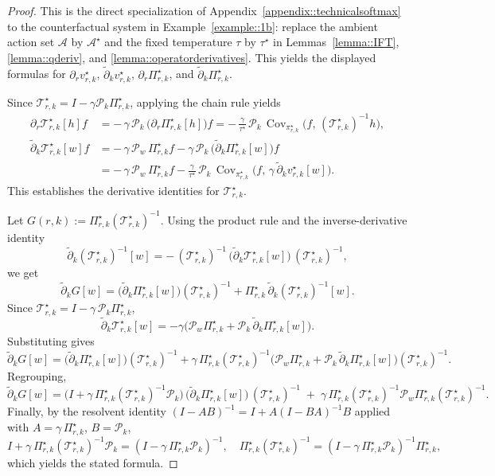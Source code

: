 \documentclass[11pt]{article}
\newcommand{\adk}{\widetilde{\partial}_k}
\theoremstyle{plain}
\begin{document}
\begin{proof}
This is the direct specialization of Appendix~\ref{appendix::technicalsoftmax} to the counterfactual system in Example~\ref{example::1b}: replace the ambient action set $\mathcal{A}$ by $\mathcal{A}^\star$ and the fixed temperature $\tau$ by $\tau^\star$ in Lemmas~\ref{lemma::IFT}, \ref{lemma::qderiv}, and \ref{lemma::operatorderivatives}. This yields the displayed formulas for $\partial_r v_{r,k}^\star$, $\adk v_{r,k}^\star$, $\partial_r \Pi_{r,k}^\star$, and $\adk \Pi_{r,k}^\star$.

Since $\mathcal{T}_{r,k}^\star = I - \gamma \mathcal{P}_k \Pi_{r,k}^\star$, applying the chain rule yields
\[
\begin{aligned}
\partial_r \mathcal{T}_{r,k}^\star[h] f
&= -\,\gamma\,\mathcal{P}_k\,\big(\partial_r \Pi_{r,k}^\star[h]\big)f
= -\,\tfrac{\gamma}{\tau^\star}\,\mathcal{P}_k\,\operatorname{Cov}_{\pi_{r,k}^\star}\!\big(f,\,(\mathcal{T}_{r,k}^\star)^{-1}h\big), \\[6pt]
\adk \mathcal{T}_{r,k}^\star[w] f
&= -\,\gamma\,\mathcal{P}_w\,\Pi_{r,k}^\star f
- \gamma\,\mathcal{P}_k\,\big(\adk \Pi_{r,k}^\star[w]\big)f \\[3pt]
&= -\,\gamma\,\mathcal{P}_w\,\Pi_{r,k}^\star f
- \tfrac{\gamma}{\tau^\star}\,\mathcal{P}_k\,\operatorname{Cov}_{\pi_{r,k}^\star}\!\big(f,\,\gamma\,\adk v_{r,k}^\star[w]\big).
\end{aligned}
\]
This establishes the derivative identities for $\mathcal{T}_{r,k}^\star$. 




Let $G(r,k):=\Pi_{r,k}^\star(\mathcal{T}_{r,k}^\star)^{-1}$. Using the product rule and the inverse-derivative identity
\[
\adk(\mathcal{T}_{r,k}^\star)^{-1}[w]
= -\,(\mathcal{T}_{r,k}^\star)^{-1}\,\big(\adk \mathcal{T}_{r,k}^\star[w]\big)\,(\mathcal{T}_{r,k}^\star)^{-1},
\]
we get
\[
\adk G[w]
= \big(\adk \Pi_{r,k}^\star[w]\big)(\mathcal{T}_{r,k}^\star)^{-1}
+ \Pi_{r,k}^\star\,\adk(\mathcal{T}_{r,k}^\star)^{-1}[w].
\]
Since $\mathcal{T}_{r,k}^\star = I-\gamma\,\mathcal{P}_k \Pi_{r,k}^\star$,
\[
\adk \mathcal{T}_{r,k}^\star[w]
= -\gamma\big(\mathcal{P}_w \Pi_{r,k}^\star + \mathcal{P}_k\,\adk \Pi_{r,k}^\star[w]\big).
\]
Substituting gives
\[
\adk G[w]
= \big(\adk \Pi_{r,k}^\star[w]\big)(\mathcal{T}_{r,k}^\star)^{-1}
+ \gamma\,\Pi_{r,k}^\star(\mathcal{T}_{r,k}^\star)^{-1}
\big(\mathcal{P}_w \Pi_{r,k}^\star + \mathcal{P}_k\,\adk \Pi_{r,k}^\star[w]\big)
(\mathcal{T}_{r,k}^\star)^{-1}.
\]
Regrouping,
\[
\adk G[w]
= \Big(I+\gamma\,\Pi_{r,k}^\star(\mathcal{T}_{r,k}^\star)^{-1}\mathcal{P}_k\Big)\,
\big(\adk \Pi_{r,k}^\star[w]\big)\,(\mathcal{T}_{r,k}^\star)^{-1}
\;+\;
\gamma\,\Pi_{r,k}^\star(\mathcal{T}_{r,k}^\star)^{-1}\mathcal{P}_w \Pi_{r,k}^\star(\mathcal{T}_{r,k}^\star)^{-1}.
\]
Finally, by the resolvent identity $(I-AB)^{-1}=I+A(I-BA)^{-1}B$ applied with $A=\gamma\,\Pi_{r,k}^\star$, $B=\mathcal{P}_k$,
\[
I+\gamma\,\Pi_{r,k}^\star(\mathcal{T}_{r,k}^\star)^{-1}\mathcal{P}_k
= (I-\gamma\,\Pi_{r,k}^\star \mathcal{P}_k)^{-1},
\quad
\Pi_{r,k}^\star(\mathcal{T}_{r,k}^\star)^{-1}
= (I-\gamma\,\Pi_{r,k}^\star \mathcal{P}_k)^{-1}\Pi_{r,k}^\star,
\]
which yields the stated formula.



   
\end{proof}
\end{document}

